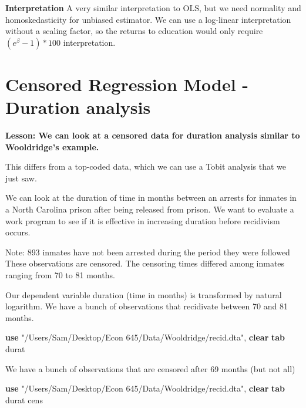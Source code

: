 \documentclass[
]{book}
\newenvironment{Shaded}{\begin{snugshade}}{\end{snugshade}}
\newcommand{\KeywordTok}[1]{\textcolor[rgb]{0.13,0.29,0.53}{\textbf{#1}}}
\newcommand{\NormalTok}[1]{#1}
\newcommand{\StringTok}[1]{\textcolor[rgb]{0.31,0.60,0.02}{#1}}
\begin{document}
\textbf{Interpretation} A very similar interpretation to OLS, but we need normality and homoskedasticity for unbiased estimator. We can use a log-linear interpretation without a scaling factor, so the returns to education would only require \((e^\beta -1)*100\) interpretation.

\section{Censored Regression Model - Duration analysis}\label{censored-regression-model---duration-analysis}

\textbf{Lesson: We can look at a censored data for duration analysis similar to Wooldridge's example.}

This differs from a top-coded data, which we can use a Tobit analysis that we just saw.

We can look at the duration of time in months between an arrests for inmates
in a North Carolina prison after being released from prison. We want to
evaluate a work program to see if it is effective in increasing duration
before recidivism occurs.

Note: 893 inmates have not been arrested during the period they were followed
These observations are censored. The censoring times differed among inmates
ranging from 70 to 81 months.

Our dependent variable duration (time in months) is transformed by natural logarithm.
We have a bunch of observations that recidivate between 70 and 81 months.

\begin{Shaded}
\begin{Highlighting}[]
\KeywordTok{use} \StringTok{"/Users/Sam/Desktop/Econ 645/Data/Wooldridge/recid.dta"}\NormalTok{, }\KeywordTok{clear}
\KeywordTok{tab}\NormalTok{ durat}
\end{Highlighting}
\end{Shaded}

We have a bunch of observations that are censored after 69 months (but not all)

\begin{Shaded}
\begin{Highlighting}[]
\KeywordTok{use} \StringTok{"/Users/Sam/Desktop/Econ 645/Data/Wooldridge/recid.dta"}\NormalTok{, }\KeywordTok{clear}
\KeywordTok{tab}\NormalTok{ durat cens}
\end{Highlighting}
\end{Shaded}
\end{document}
